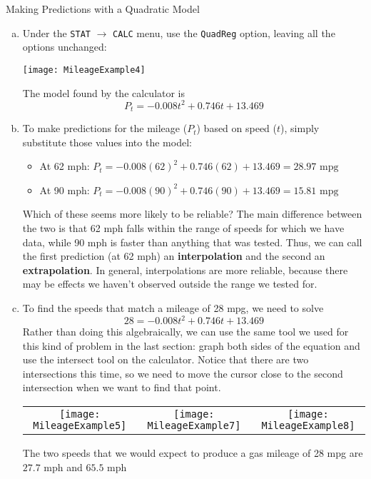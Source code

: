 \begin{example}[https://www.youtube.com/watch?v=FemfjoeQ0hk&list=PLfmpjsIzhztutjEb8Pg5OBOlI1p80yVoy&index=7]{Making Predictions with a Quadratic Model}
\begin{enumerate}[(a)]
\item Under the \texttt{STAT} $\longrightarrow$ \texttt{CALC} menu, use the \texttt{QuadReg} option, leaving all the options unchanged:
\begin{center}
\texttt{[image: MileageExample4]}
\end{center}
The model found by the calculator is \[\boxed{P_t = -0.008t^2 + 0.746t + 13.469}\]
\pagebreak

\item To make predictions for the mileage ($P_t$) based on speed ($t$), simply substitute those values into the model:
\begin{itemize}
\item At 62 mph: $P_t = -0.008(62)^2 + 0.746(62) + 13.469 = \boxed{28.97 \textrm{ mpg}}$
\item At 90 mph: $P_t = -0.008(90)^2 + 0.746(90) + 13.469 = \boxed{15.81 \textrm{ mpg}}$
\end{itemize}

Which of these seems more likely to be reliable?  The main difference between the two is that 62 mph falls within the range of speeds for which we have data, while 90 mph is faster than anything that was tested.  Thus, we can call the first prediction (at 62 mph) an \textbf{interpolation} and the second an \textbf{extrapolation}.  In general, interpolations are more reliable, because there may be effects we haven't observed outside the range we tested for.

\item To find the speeds that match a mileage of 28 mpg, we need to solve
\[28 = -0.008t^2 + 0.746t + 13.469\]
Rather than doing this algebraically, we can use the same tool we used for this kind of problem in the last section: graph both sides of the equation and use the intersect tool on the calculator.  Notice that there are two intersections this time, so we need to move the cursor close to the second intersection when we want to find that point.
\begin{center}
\begin{tabular}{c c c}
\texttt{[image: MileageExample5]}
& \texttt{[image: MileageExample7]}
& \texttt{[image: MileageExample8]}
\end{tabular}
\end{center}

The two speeds that we would expect to produce a gas mileage of 28 mpg are $\boxed{27.7 \textrm{ mph}}$ and $\boxed{65.5 \textrm{ mph}}$
\end{enumerate}
\end{example}

